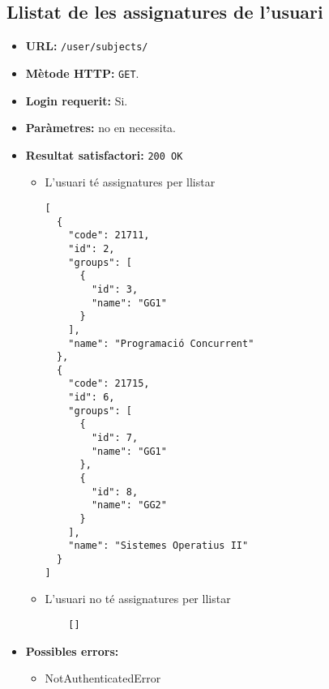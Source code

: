\subsection{Llistat de les assignatures de l'usuari}
\begin{itemize}
\item \textbf{\ac{URL}:} \texttt{/user/subjects/}
\item \textbf{Mètode \ac{HTTP}: } \texttt{GET}.
\item \textbf{Login requerit:} Si.
\item \textbf{Paràmetres:} no en necessita.

\item \textbf{Resultat satisfactori:} \texttt{200 OK}
	\begin{itemize}
		\item L'usuari té assignatures per llistar
	\begin{verbatim}
[
  {
    "code": 21711,
    "id": 2,
    "groups": [
      {
        "id": 3,
        "name": "GG1"
      }
    ],
    "name": "Programació Concurrent"
  },
  {
    "code": 21715,
    "id": 6,
    "groups": [
      {
        "id": 7,
        "name": "GG1"
      },
      {
        "id": 8,
        "name": "GG2"
      }
    ],
    "name": "Sistemes Operatius II"
  }
]
	\end{verbatim}
	
	\item L'usuari no té assignatures per llistar
	
	\begin{verbatim}
	[]
	\end{verbatim}
	\end{itemize}


\item \textbf{Possibles errors:}
	\begin{itemize}
		\item NotAuthenticatedError
	\end{itemize}
\end{itemize}

